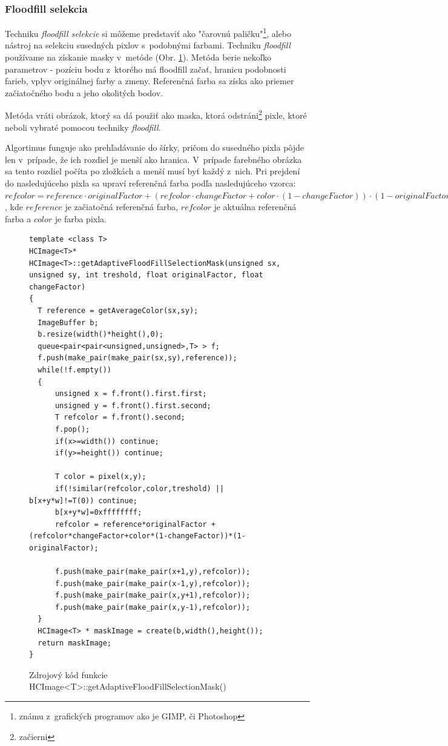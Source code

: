 \subsubsection{Floodfill selekcia}
Techniku \textit{floodfill selekcie} si môžeme predstaviť ako "čarovnú paličku"\footnote{známu z~grafických programov ako je GIMP, či Photoshop}, alebo nástroj na selekciu susedných pixlov s~podobnými farbami. Techniku \textit{floodfill} používame na získanie masky v~metóde  (Obr. \ref{fig:getAdaptiveFloodFillSelectionMask}). Metóda berie nekoľko parametrov - pozíciu bodu z~ktorého má floodfill začať, hranicu podobnosti farieb, vplyv originálnej farby a zmeny. Referenčná farba sa získa ako priemer začiatočného bodu a jeho okolitých bodov. 

Metóda vráti obrázok, ktorý sa dá použiť ako maska, ktorá odstráni\footnote{začierni} pixle, ktoré neboli vybraté pomocou techniky \textit{floodfill}.

Algortimus funguje ako prehľadávanie do šírky, pričom do susedného pixla pôjde len v~prípade, že ich rozdiel je menší ako hranica. V~prípade farebného obrázka sa tento rozdiel počíta po zložkách a menší musí byť každý z~nich. Pri prejdení do nasledujúceho pixla sa upraví referenčná farba podľa nasledujúceho vzorca: $refcolor = reference \cdot originalFactor + (refcolor\cdot changeFactor+color \cdot (1-changeFactor)) \cdot (1-originalFactor)$, kde $reference$ je začiatočná referenčná farba, $refcolor$ je aktuálna referenčná farba a $color$ je farba pixla.

\begin{figure}[htp]
\begin{lstlisting}
template <class T>
HCImage<T>* HCImage<T>::getAdaptiveFloodFillSelectionMask(unsigned sx, unsigned sy, int treshold, float originalFactor, float changeFactor)
{
  T reference = getAverageColor(sx,sy);
  ImageBuffer b;
  b.resize(width()*height(),0);
  queue<pair<pair<unsigned,unsigned>,T> > f;
  f.push(make_pair(make_pair(sx,sy),reference));
  while(!f.empty())
  {
      unsigned x = f.front().first.first;
      unsigned y = f.front().first.second;
      T refcolor = f.front().second;
      f.pop();
      if(x>=width()) continue;
      if(y>=height()) continue;

      T color = pixel(x,y);
      if(!similar(refcolor,color,treshold) || b[x+y*w]!=T(0)) continue;
      b[x+y*w]=0xffffffff;
      refcolor = reference*originalFactor + (refcolor*changeFactor+color*(1-changeFactor))*(1-originalFactor);

      f.push(make_pair(make_pair(x+1,y),refcolor));
      f.push(make_pair(make_pair(x-1,y),refcolor));
      f.push(make_pair(make_pair(x,y+1),refcolor));
      f.push(make_pair(make_pair(x,y-1),refcolor));
  }
  HCImage<T> * maskImage = create(b,width(),height());
  return maskImage;
}\end{lstlisting}
\caption{Zdrojový kód funkcie HCImage<T>::getAdaptiveFloodFillSelectionMask()}
\label{fig:getAdaptiveFloodFillSelectionMask}
\end{figure}

